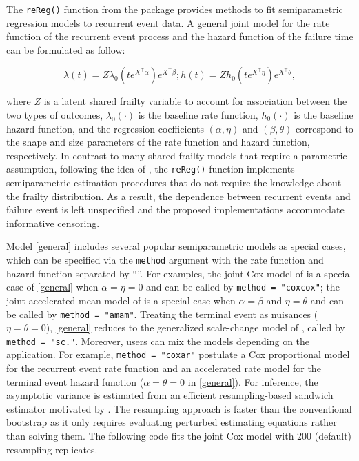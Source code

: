 The \texttt{reReg()} function from the  package provides
methods to fit semiparametric regression models to recurrent event data.
A general joint model for the rate function of the recurrent event
process and the hazard function of the failure time can be formulated as
follow:

\begin{equation}
\lambda(t) = Z \lambda_0(te^{X^\top\alpha})e^{X^\top\beta};
h(t) = Z h_0(te^{X^\top\eta})e^{X^\top\theta},\label{general}
\end{equation}

where \(Z\) is a latent shared frailty variable to account for
association between the two types of outcomes, \(\lambda_0(\cdot)\) is
the baseline rate function, \(h_0(\cdot)\) is the baseline hazard
function, and the regression coefficients \((\alpha, \eta)\) and
\((\beta, \theta)\) correspond to the shape and size parameters of the
rate function and hazard function, respectively. In contrast to many
shared-frailty models that require a parametric assumption, following
the idea of \citet{wang2001analyzing}, the \texttt{reReg()} function
implements semiparametric estimation procedures that do not require the
knowledge about the frailty distribution. As a result, the dependence
between recurrent events and failure event is left unspecified and the
proposed implementations accommodate informative censoring.

Model \eqref{general} includes several popular semiparametric models as
special cases, which can be specified via the \texttt{method} argument
with the rate function and hazard function separated by
``\texttt{\textbar{}}''. For examples, the joint Cox model of
\citet{huang2004joint} is a special case of \eqref{general} when
\(\alpha = \eta = 0\) and can be called by
\texttt{method\ =\ "cox\textbar{}cox"}; the joint accelerated mean model
of \citet{xu2017joint} is a special case when \(\alpha = \beta\) and
\(\eta = \theta\) and can be called by
\texttt{method\ =\ "am\textbar{}am"}. Treating the terminal event as
nuisances (\(\eta = \theta = 0\)), \eqref{general} reduces to the
generalized scale-change model of \citet{xu2019generalized}, called by
\texttt{method\ =\ "sc\textbar{}."}. Moreover, users can mix the models
depending on the application. For example,
\texttt{method\ =\ "cox\textbar{}ar"} postulate a Cox proportional model
for the recurrent event rate function and an accelerated rate model for
the terminal event hazard function (\(\alpha = \theta = 0\) in
\eqref{general}). For inference, the asymptotic variance is estimated
from an efficient resampling-based sandwich estimator motivated by
\citet{zeng2008efficient}. The resampling approach is faster than the
conventional bootstrap as it only requires evaluating perturbed
estimating equations rather than solving them. The following code fits
the joint Cox model with 200 (default) resampling replicates.

